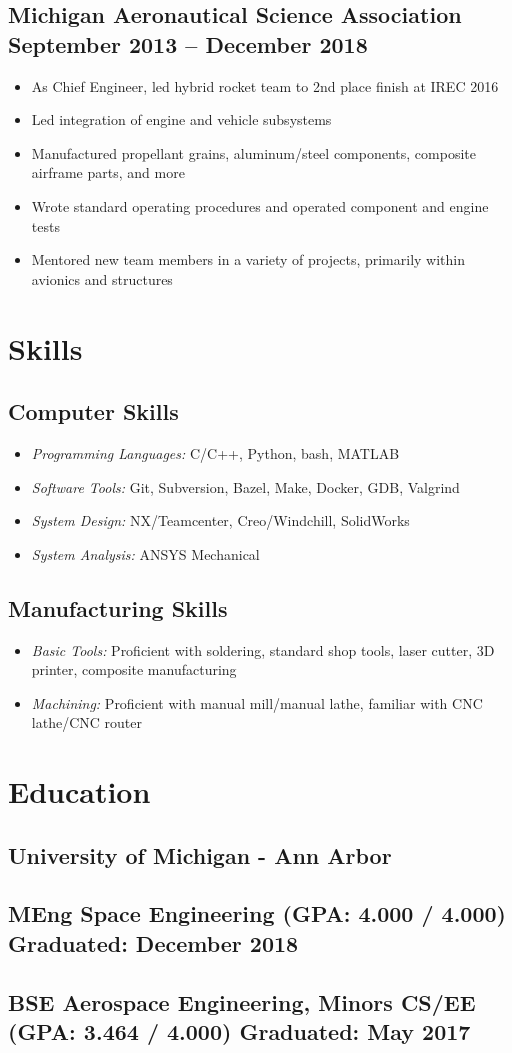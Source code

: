 \documentclass{article}
\begin{document}
\subsection{\textbf{Michigan Aeronautical Science Association} \hfill September 2013 -- December 2018}
\begin{itemize}
    \item As Chief Engineer, led hybrid rocket team to 2nd place finish at IREC 2016
    \item Led integration of engine and vehicle subsystems
    \item Manufactured propellant grains, aluminum/steel components, composite airframe parts, and more
    \item Wrote standard operating procedures and operated component and engine tests
    \item Mentored new team members in a variety of projects, primarily within avionics and structures
\end{itemize}

\section{Skills}

\subsection{Computer Skills}
\begin{itemize}
    \item \textit{Programming Languages:} C/C++, Python, bash, MATLAB
    \item \textit{Software Tools:} Git, Subversion, Bazel, Make, Docker, GDB, Valgrind
    \item \textit{System Design:} NX/Teamcenter, Creo/Windchill, SolidWorks
    \item \textit{System Analysis:} ANSYS Mechanical
\end{itemize}

\subsection{Manufacturing Skills}
\begin{itemize}
    \item \textit{Basic Tools:} Proficient with soldering, standard shop tools, laser cutter, 3D printer, composite manufacturing
    \item \textit{Machining:} Proficient with manual mill/manual lathe, familiar with CNC lathe/CNC router
\end{itemize}

\section{Education}
\subsection{\textbf{University of Michigan - Ann Arbor}}
\subsection{MEng Space Engineering (GPA: 4.000 / 4.000) \hfill Graduated: December 2018}
\subsection{BSE Aerospace Engineering, Minors CS/EE (GPA: 3.464 / 4.000) \hfill Graduated: May 2017}
\end{document}

